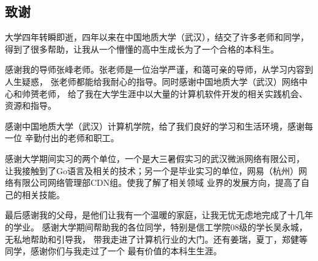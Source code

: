 \documentclass[twoside]{CUGThesis}
\begin{document}
	\begin{spacing}{2}
		\section*{致谢}
	\end{spacing}
	大学四年转瞬即逝，四年以来在中国地质大学（武汉），结交了许多老师和同学，
	得到了很多帮助，让我从一个懵懂的高中生成长为了一个合格的本科生。\par 
	感谢我的导师张峰老师。张老师是一位治学严谨，和蔼可亲的导师，从学习内容到人生疑惑，
	张老师都能给我耐心的指导。同时感谢中国地质大学（武汉）网络中心和帅赟老师，
	给了我在大学生涯中以大量的计算机软件开发的相关实践机会、资源和指导。\par 
	感谢中国地质大学（武汉）计算机学院，给了我们良好的学习和生活环境，感谢每一位
	辛勤付出的老师和职工。\par
	感谢大学期间实习的两个单位，一个是大三暑假实习的武汉微派网络有限公司，
	让我接触到了Go语言及相关的技术；另一个是毕业实习的单位，网易（杭州）网络有限公司网络管理部CDN组。使我了解了相关领域
	业界的发展方向，提高了自己的相关技能。\par
	最后感谢我的父母，是他们让我有一个温暖的家庭，让我无忧无虑地完成了十几年的学业。
	感谢大学期间帮助我的各位同学，特别是信工学院08级的学长吴永城，无私地帮助和引导我，
	带我走进了计算机行业的大门。还有姜瑞，夏丁，郑健等同学，感谢你们与我走过了一个
	最有价值的本科生生涯。
	
	
	\clearpage
	
	
	
\end{document}

